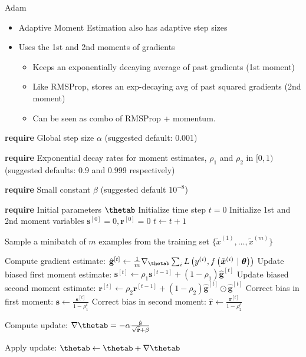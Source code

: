 \documentclass[11pt,compress,t,notes=noshow, xcolor=table]{beamer}
\begin{document}
\begin{vbframe}{Adam}
	\begin{itemize}
		\item Adaptive Moment Estimation also has adaptive step sizes
		\item Uses the 1st and 2nd moments of gradients
		\begin{itemize}
			\item Keeps an exponentially decaying average of past gradients (1st moment)
			\item Like RMSProp, stores an exp-decaying avg of past squared gradients (2nd moment)
			\item Can be seen as combo of RMSProp + momentum.
		\end{itemize}
	\end{itemize}
	
	
	\framebreak
	
	\begin{algorithm}[H]
		\scriptsize 
		\caption{Adam}
		\begin{algorithmic}[1]
			\State \textbf{require} Global step size $\alpha$ (suggested default: 0.001) \strut
			\State \parbox[t]{\dimexpr\linewidth-\algorithmicindent}{\textbf{require} Exponential decay rates for moment estimates, $\rho_1$ and $\rho_2$ in $[0,1)$ (suggested defaults: 0.9 and 0.999 respectively)} \strut
			\State \parbox[t]{\dimexpr\linewidth-\algorithmicindent}{\textbf{require} Small constant $\beta$ (suggested default $10^{-8}$) \strut}
			\State \textbf{require} Initial parameters $\thetab$ 
			\State Initialize time step $t = 0$
			\State Initialize 1st and 2nd moment variables $\mathbf{s}^{[0]} = 0, \mathbf{r}^{[0]} = 0$
			\State $t \leftarrow t + 1$
			\State \parbox[t]{\dimexpr\linewidth-\algorithmicindent}{Sample a minibatch of $m$ examples from the training set $\{\tilde{x}^{(1)},\dots,\tilde{x}^{(m)}\}$ \strut}
			\State Compute gradient estimate: $\hat{\mathbf{g}}^{[t]} \leftarrow \frac{1}{m} \nabla_{\thetab} \sum_{i} \Lxym$
			\State Update biased first moment estimate: $\mathbf{s}^{[t]} \leftarrow \rho_1 \mathbf{s}^{[t-1]}  + (1 - \rho_1) \hat{\mathbf{g}}^{[t]}$
			\State Update biased second moment estimate: $\mathbf{r}^{[t]} \leftarrow \rho_2 \mathbf{r}^{[t-1]}  + (1 - \rho_2) \hat{\mathbf{g}}^{[t]} \odot \hat{\mathbf{g}}^{[t]}$
			\State Correct bias in first moment: $\hat{\mathbf{s}} \leftarrow \frac{\mathbf{s}^{[t]} }{1-\rho_1^t}$
			\State Correct bias in second moment: $\hat{\mathbf{r}} \leftarrow \frac{\mathbf{r}^{[t]} }{1-\rho_2^t}$
			\State \parbox[t]{\dimexpr\linewidth-\algorithmicindent}{Compute update: $\nabla\thetab = - \alpha \frac{\hat{\mathbf{s}}}{\sqrt{\hat{\mathbf{r}}} + \beta}$ \strut}
			\State Apply update: $\thetab \leftarrow \thetab + \nabla\thetab$
			

\end{algorithmic}
\end{algorithm}
\end{vbframe}
\end{document}
